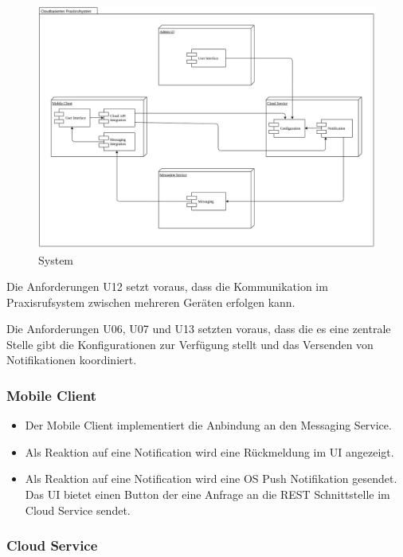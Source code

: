 \begin{figure}[h]
    \centering
    \begin{minipage}[b]{1.0\textwidth}
        \includegraphics[width=\textwidth]{graphics/Component_System}
        \caption{System}
    \end{minipage}
\end{figure}

\clearpage

Die Anforderungen U12 setzt voraus, dass die Kommunikation im Praxisrufsystem
zwischen mehreren Geräten erfolgen kann.

Die Anforderungen U06, U07 und U13 setzten voraus, dass die es eine zentrale Stelle gibt
die Konfigurationen zur Verfügung stellt und das Versenden von Notifikationen koordiniert.

\subsubsection*{Mobile Client}

\begin{itemize}
    \item Der Mobile Client implementiert die Anbindung an den Messaging Service.
    \item Als Reaktion auf eine Notification wird eine Rückmeldung im UI angezeigt.
    \item Als Reaktion auf eine Notification wird eine OS Push Notifikation gesendet.
    Das UI bietet einen Button der eine Anfrage an die REST Schnittstelle im Cloud Service sendet.
\end{itemize}


\subsubsection*{Cloud Service}

